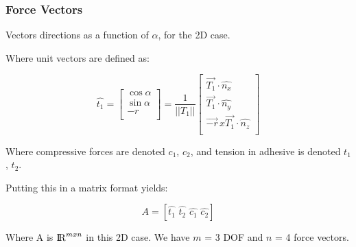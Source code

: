 \documentclass{beamer}
\begin{document}
\frame
{
\frametitle{Force Vectors}

Vectors directions as a function of $\alpha$, for the 2D case.  


Where unit vectors are defined as: 

\begin{equation}
\hat{t_{1}} =
\begin{bmatrix}
           \cos{\alpha}  \\
           \sin{\alpha} \\
           -r \\
\end{bmatrix} =
 \frac{1}{||T_{1}||}
\begin{bmatrix}
           \vec{T_{1}} \cdot \hat{n_{x}}  \\
           \vec{T_{1}} \cdot \hat{n_{y}} \\
           \vec{-r}\,  x \vec{T_{1}} \cdot \hat{n_{z}} \\
\end{bmatrix} 
\end{equation}
         
Where compressive forces are denoted $c_{1}$, $c_{2}$, and tension in adhesive is denoted  $t_{1}$, $t_{2}$.

Putting this in a matrix format yields: 

\begin{equation}
A =  [\hat{t_{1}} \,\,  \hat{t_{2}}\,\,  \hat{c_{1}}\,\,   \hat{c_{2}}]
\end{equation}
	
Where A is ${\rm I\!R} ^{m x n}$ in this 2D case. We have $m$ = 3 DOF and $n$ = 4 force vectors.
}
\end{document}
